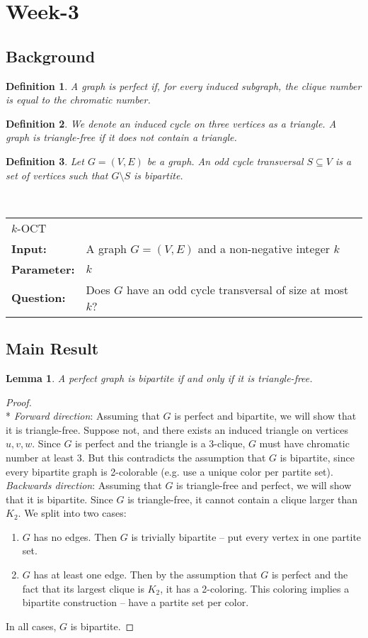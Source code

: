 \documentclass{article}
\newcommand{\problem}[1]{\textsc{#1}}
\newtheorem{lemma}{Lemma}
\newtheorem{definition}{Definition}
\newcommand{\defproblem}[4]{%
  \hfill\\\smallskip\noindent%
  \begin{tabularx}{\textwidth}{|l X|}%
    \hline%
    \multicolumn{2}{|l|}{\problem{#1}}\\%
    \textbf{Input:}&#2\\%
    \textbf{Parameter:}&#3\\%
    \textbf{Question:}&#4\smallskip\\\hline%
  \end{tabularx}%
  \smallskip%
}%
\newcommand{\proofnewline}{\mbox{}\\*}
\begin{document}
\newpage
\section*{Week-3}
\subsection*{Background}
\begin{definition}
A graph is \emph{perfect} if, for every induced subgraph, the clique number is equal to the chromatic number.
\end{definition}

\begin{definition}
We denote an induced cycle on three vertices as a \emph{triangle}. A graph is \emph{triangle-free} if it does not contain a triangle.
\end{definition}

\begin{definition}
Let $G = (V, E)$ be a graph. An \emph{odd cycle transversal} $S \subseteq V$ is a set of vertices such that $G \setminus S$ is bipartite.
\end{definition}

\defproblem{$k$-OCT}
{A graph $G = (V,E)$ and a non-negative integer $k$}
{$k$}
{Does $G$ have an odd cycle transversal of size at most $k$?}

\subsection*{Main Result}
\begin{lemma}
\label{lemma:perfect}
A perfect graph is bipartite if and only if it is triangle-free.
\end{lemma}
\begin{proof}\proofnewline
\emph{Forward direction}: Assuming that $G$ is perfect and bipartite, we will show that it is triangle-free. Suppose not, and there exists an induced triangle on vertices $u, v, w$. Since $G$ is perfect and the triangle is a 3-clique, $G$ must have chromatic number at least 3. But this contradicts the assumption that $G$ is bipartite, since every bipartite graph is 2-colorable (e.g. use a unique color per partite set).\\

\noindent \emph{Backwards direction}: Assuming that $G$ is triangle-free and perfect, we will show that it is bipartite. Since $G$ is triangle-free, it cannot contain a clique larger than $K_2$. We split into two cases:
\begin{enumerate}
\item $G$ has no edges. Then $G$ is trivially bipartite -- put every vertex in one partite set.
\item $G$ has at least one edge. Then by the assumption that $G$ is perfect and the fact that its largest clique is $K_2$, it has a 2-coloring. This coloring implies a bipartite construction -- have a partite set per color.
\end{enumerate}
In all cases, $G$ is bipartite.
\end{proof}
\end{document}
